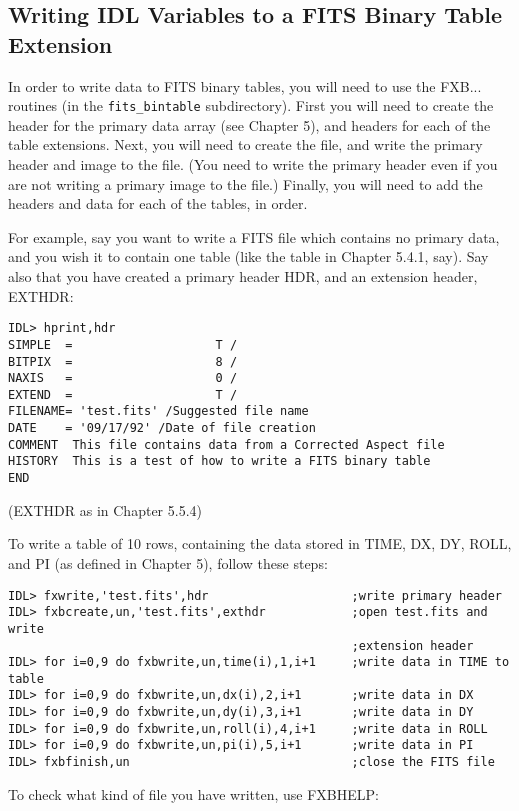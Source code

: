 \subsection{Writing IDL Variables to a FITS Binary Table Extension}
 
In order to write data to FITS binary tables, you will need to use the
FXB... routines (in the {\tt fits{\_}bintable} subdirectory). First you will need to
create the header for the primary data array (see Chapter 5), and
headers for each of the table extensions. Next, you will need to create the
file, and write the primary header and image to the file. (You need to
write the primary header even if you are not writing a primary image to the
file.) Finally, you will need to add the headers and data for each of the
tables, in order.
 
For example, say you want to write a FITS file which contains no primary data,
and you wish it to contain one table (like the table in Chapter 5.4.1, say).
Say also that you have created a primary header HDR, and an extension header,
EXTHDR:

\medskip\noindent
\begin{verbatim}
IDL> hprint,hdr
SIMPLE  =                    T /
BITPIX  =                    8 /
NAXIS   =                    0 /
EXTEND  =                    T /
FILENAME= 'test.fits' /Suggested file name
DATE    = '09/17/92' /Date of file creation
COMMENT  This file contains data from a Corrected Aspect file
HISTORY  This is a test of how to write a FITS binary table
END
\end{verbatim}
(EXTHDR as in Chapter 5.5.4)
 
To write a table of 10 rows, containing the data stored in TIME, DX, DY,
ROLL, and PI (as defined in Chapter 5), follow these steps:

\medskip\noindent
\begin{verbatim}
IDL> fxwrite,'test.fits',hdr                    ;write primary header
IDL> fxbcreate,un,'test.fits',exthdr            ;open test.fits and write
                                                ;extension header
IDL> for i=0,9 do fxbwrite,un,time(i),1,i+1     ;write data in TIME to table
IDL> for i=0,9 do fxbwrite,un,dx(i),2,i+1       ;write data in DX
IDL> for i=0,9 do fxbwrite,un,dy(i),3,i+1       ;write data in DY
IDL> for i=0,9 do fxbwrite,un,roll(i),4,i+1     ;write data in ROLL
IDL> for i=0,9 do fxbwrite,un,pi(i),5,i+1       ;write data in PI
IDL> fxbfinish,un                               ;close the FITS file
\end{verbatim}
To check what kind of file you have written, use FXBHELP:

